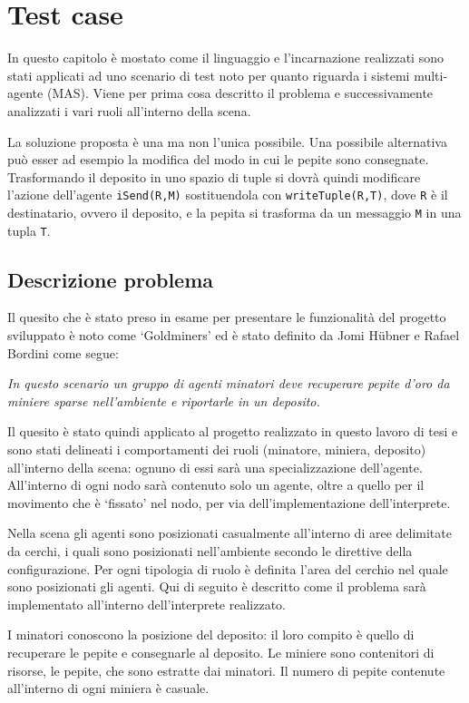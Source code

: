 \chapter{Test case}\label{chap:validation}
In questo capitolo è mostato come il linguaggio e l'incarnazione realizzati sono stati applicati ad uno scenario di test noto per quanto riguarda i sistemi multi-agente (MAS).
Viene per prima cosa descritto il problema e successivamente analizzati i vari ruoli all'interno della scena.

La soluzione proposta è una ma non l'unica possibile. Una possibile alternativa può esser ad esempio la modifica del modo in cui le pepite sono consegnate. Trasformando il deposito in uno spazio di tuple si dovrà quindi modificare l'azione dell'agente \texttt{iSend(R,M)} sostituendola con \texttt{writeTuple(R,T)}, dove \texttt{R} è il destinatario, ovvero il deposito, e la pepita si trasforma da un messaggio \texttt{M} in una tupla \texttt{T}.

\section{Descrizione problema}
Il quesito che è stato preso in esame per presentare le funzionalità del progetto sviluppato è noto come `Goldminers' ed è stato definito da Jomi H\"ubner e Rafael Bordini come segue:
%
\begin{center}
	\textit{In questo scenario un gruppo di agenti minatori deve recuperare pepite d'oro da miniere sparse nell'ambiente e riportarle in un deposito.}
\end{center}

Il quesito è stato quindi applicato al progetto realizzato in questo lavoro di tesi e sono stati delineati i comportamenti dei ruoli (minatore, miniera, deposito) all'interno della scena: ognuno di essi sarà una specializzazione dell'agente. All'interno di ogni nodo sarà contenuto solo un agente, oltre a quello per il movimento che è `fissato' nel nodo, per via dell'implementazione dell'interprete.

Nella scena gli agenti sono posizionati casualmente all'interno di aree delimitate da cerchi, i quali sono posizionati nell'ambiente secondo le direttive della configurazione. Per ogni tipologia di ruolo è definita l'area del cerchio nel quale sono posizionati gli agenti.
%
Qui di seguito è descritto come il problema sarà implementato all'interno dell'interprete realizzato.

I minatori conoscono la posizione del deposito: il loro compito è quello di recuperare le pepite e consegnarle al deposito.
Le miniere sono contenitori di risorse, le pepite, che sono estratte dai minatori. Il numero di pepite contenute all'interno di ogni miniera è casuale.

